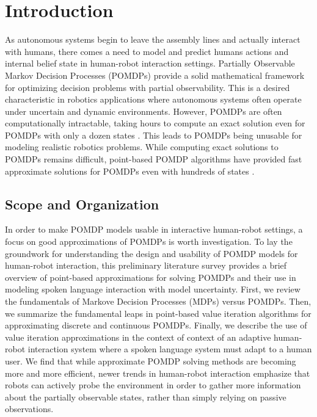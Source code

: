 \documentclass[12pt]{elsarticle}
\begin{document}


\section{Introduction}
As autonomous systems begin to leave the assembly lines and actually interact with humans, there comes a need to model and predict humans actions and internal belief state in human-robot interaction settings. Partially Observable Markov Decision Processes (POMDPs) provide a solid mathematical framework for optimizing decision problems with partial observability. This is a desired characteristic in robotics applications where autonomous systems often operate under uncertain and dynamic environments. However, POMDPs are often computationally intractable, taking hours to compute an exact solution even for POMDPs with only a dozen states \cite{kurniawati2008sarsop}. This leads to POMDPs being unusable for modeling realistic robotics problems. While computing exact solutions to POMDPs remains difficult, point-based POMDP algorithms have provided fast approximate solutions for POMDPs even with hundreds of states \cite{kurniawati2008sarsop}. 


\subsection{Scope and Organization}
In order to make POMDP models usable in interactive human-robot settings, a focus on good approximations of POMDPs is worth investigation. To lay the groundwork for understanding the design and usability of POMDP models for human-robot interaction, this preliminary literature survey provides a brief overview of point-based approximations for solving POMDPs and their use in modeling spoken language interaction with model uncertainty. First, we review the fundamentals of Markove Decision Processes (MDPs) versus POMDPs. Then, we summarize the fundamental leaps in point-based value iteration algorithms for approximating discrete and continuous POMDPs. Finally, we describe the use of value iteration approximations in the context of context of an adaptive human-robot interaction system where a spoken language system must adapt to a human user. {\color{red}We find that while approximate POMDP solving methods are becoming more and more efficient, newer trends in human-robot interaction emphasize that robots can actively probe the environment in order to gather more information about the partially observable states, rather than simply relying on passive observations.}
\end{document}
